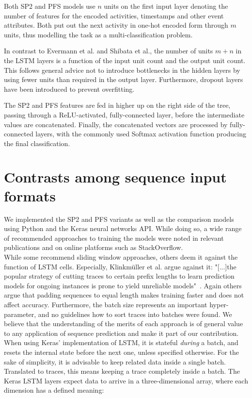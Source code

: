 Both SP2 and PFS models use $n$ units on the first input layer denoting the number of features for the encoded activities, timestamps and other event attributes. Both put out the next activity in one-hot encoded form through $m$ units, thus modelling the task as a multi-classification problem.

In contrast to Evermann et al. and Shibata et al., the number of units $m+n$ in the LSTM layers is a function of the input unit count and the output unit count. This follows general advice not to introduce bottlenecks in the hidden layers by using fewer units than required in the output layer. Furthermore, dropout layers have been introduced to prevent overfitting.

The SP2 and PFS features are fed in higher up on the right side of the tree, passing through a ReLU-activated, fully-connected layer, before the intermediate values are concatenated. Finally, the concatenated vectors are processed by fully-connected layers, with the commonly used Softmax activation function producing the final classification.

\section{Contrasts among sequence input formats}
\label{sec:contrib:input-formatting}
We implemented the SP2 and PFS variants as well as the comparison models using Python and the Keras neural networks API. While doing so, a wide range of recommended approaches to training the models were noted in relevant publications and on online platforms such as StackOverflow.\\

While some recommend sliding window approaches, others deem it against the function of LSTM cells. Especially, Klinkmüller et al. argue against it: "[...]the popular strategy of cutting traces to certain preﬁx lengths to learn prediction models for ongoing instances is prone to yield unreliable models"~\cite{klinkmuller2018reliablemonitoring}. Again others argue that padding sequences to equal length makes training faster and does not affect accuracy. Furthermore, the batch size represents an important hyper-parameter, and no guidelines how to sort traces into batches were found. We believe that the understanding of the merits of each approach is of general value to any application of sequence prediction and make it part of our contribution.\\

When using Keras' implementation of LSTM, it is stateful \textit{during} a batch, and resets the internal state before the next one, unless specified otherwise. For the sake of simplicity, it is advisable to keep related data inside a single batch. Translated to traces, this means keeping a trace completely inside a batch. The Keras LSTM layers expect data to arrive in a three-dimensional array, where each dimension has a defined meaning:

